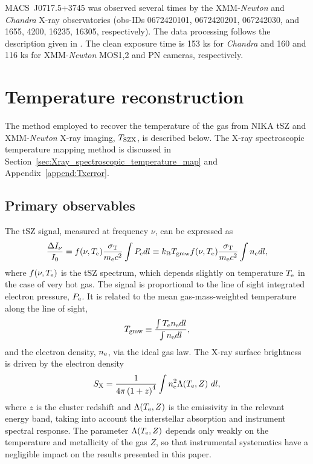 \documentclass[twocolumn,traditabstract]{aa}
\def\TSZ {T_{\rm SZX}}
\def\TMW {T_{\rm gmw}}
\begin{document}
\mbox{MACS~J0717.5+3745} was observed several times by the XMM-\textit{Newton} and \textit{Chandra} X-ray observatories (obs-IDs 0672420101, 0672420201, 067242030, and 1655, 4200, 16235, 16305, respectively). The data processing follows the description given in \cite{Adam2016b}. The clean exposure time is 153 ks for \textit{Chandra} and 160 and 116 ks for XMM-\textit{Newton} MOS1,2 and PN cameras, respectively.

\section{Temperature reconstruction}\label{sec:method}
The method employed to recover the temperature of the gas from NIKA tSZ and XMM-\textit{Newton} X-ray imaging, $\TSZ$, is described below. The X-ray spectroscopic temperature mapping method is discussed in Section~\ref{sec:Xray_spectroscopic_temperature_map} and Appendix~\ref{append:Txerror}.

\subsection{Primary observables}
The tSZ signal, measured at frequency $\nu$, can be expressed as
\begin{equation}
        \frac{\Delta I_{\nu}}{I_0} = f(\nu, T_{\rm e}) \frac{\sigma_{\rm T}}{m_{\rm e} c^2} \int P_{\rm e} dl \equiv k_{\rm B} \TMW f(\nu, T_{\rm e}) \frac{\sigma_{\rm T}}{m_{\rm e} c^2} \int n_{\rm e} dl,
\label{eq:dIsz}
\end{equation}
where $f(\nu, T_{\rm e})$ is the tSZ spectrum, which depends slightly on temperature $T_{\rm e}$ in the case of very hot gas. The signal is proportional to the line of sight integrated electron pressure, $P_{\rm e}$. It is related to the mean gas-mass-weighted temperature along the line of sight, 
\begin{equation}
       \TMW  \equiv \frac{\int T_{\rm e} n_{\rm e} dl}{\int n_{\rm e} dl},
        \label{eq:Tgmw_def}
\end{equation}
and the electron density, $n_{\rm e}$, via the ideal gas law. The X-ray surface brightness is driven by the electron density
\begin{equation}
        S_{\rm X}= \frac{1}{4 \pi \left(1+z\right)^4} \int n_{\rm e}^2 \Lambda(T_{\rm e}, Z) \ dl,
        \label{eq:sx}
\end{equation}
where $z$ is the cluster redshift and $\Lambda(T_{\rm e}, Z)$ is the emissivity in the relevant energy band, taking into account the interstellar absorption and instrument spectral response. The parameter $\Lambda(T_{\rm e}, Z)$ depends only weakly on the temperature and metallicity of the gas $Z$, so that instrumental systematics have a negligible impact on the results presented in this paper.
\end{document}
